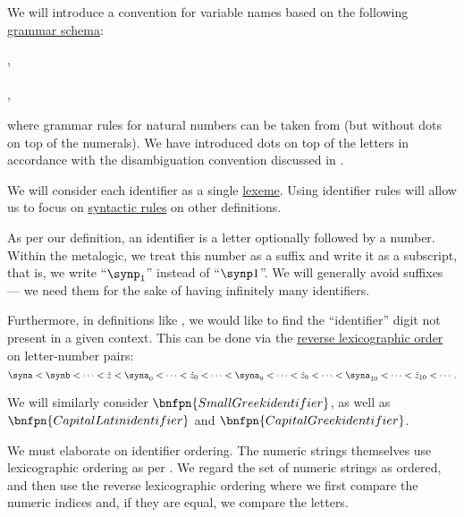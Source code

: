 \begin{definition}\label{def:variable_identifier}\mimprovised
  We will introduce a convention for variable names based on the following \hyperref[def:formal_grammar/schema]{grammar schema}:
  \begin{bnf*}
         {\bnftsq{\( \syna \)} \bnfor \bnftsq{\( \synb \)} \bnfor \cdots \bnfor {} \bnfor {}}, \\
     { \bnfor} \\
    , \\
  \end{bnf*}
  where grammar rules for natural numbers can be taken from  (but without dots on top of the numerals). We have introduced dots on top of the letters in accordance with the disambiguation convention discussed in .

  We will consider each identifier as a single \hyperref[con:abstract_syntax_tree/lexical]{lexeme}. Using identifier rules will allow us to focus on \hyperref[con:abstract_syntax_tree/syntactic]{syntactic rules} on other definitions.

  As per our definition, an identifier is a letter optionally followed by a number. Within the metalogic, we treat this number as a suffix and write it as a subscript, that is, we write \enquote{\( \synp_1 \)} instead of \enquote{\( \synp1 \)}. We will generally avoid suffixes --- we need them for the sake of having infinitely many identifiers.

  Furthermore, in definitions like , we would like to find the \enquote{identifier} digit not present in a given context. This can be done via the \hyperref[thm:def:well_ordered_set/lexicographic]{reverse lexicographic order} on letter-number pairs:
  \begin{equation*}
    \syna < \synb < \cdots < \syn z < \syna_0 < \cdots < \syn z_0 < \cdots < \syna_9 < \cdots < \syn z_9 < \cdots < \syna_{10} < \cdots < \syn z_{10} < \cdots.
  \end{equation*}

  We will similarly consider \( \bnfpn{Small Greek identifier} \), as well as \( \bnfpn{Capital Latin identifier} \) and \( \bnfpn{Capital Greek identifier} \).
\end{definition}
\begin{comments}
  \item We must elaborate on identifier ordering. The numeric strings themselves use lexicographic ordering as per . We regard the set of numeric strings as ordered, and then use the reverse lexicographic ordering where we first compare the numeric indices and, if they are equal, we compare the letters.
\end{comments}

